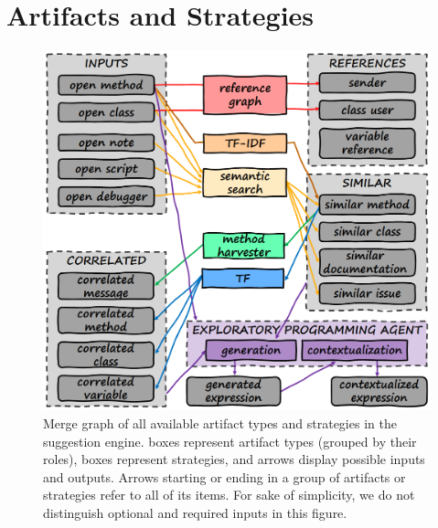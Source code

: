 
\section{Artifacts and Strategies}
\label{sec:suggestions/overview}

\begin{figure}
	\begin{minipage}{\textwidth}
		\centering
		\includegraphics[height=17\baselineskip]{01_overview/graph.png}
		\caption[Merge graph of all available artifact types and strategies in the suggestion engine.]{
			Merge graph of all available artifact types and strategies in the suggestion engine.
			\bold{\textcolor{gray}{Gray}} boxes represent artifact types (grouped by their roles\footnotemark),  boxes represent strategies, and arrows display possible inputs and outputs.
			Arrows starting or ending in a group of artifacts or strategies refer to all of its items.
			For sake of simplicity, we do not distinguish optional and required inputs in this figure.
		}
		\label{fig:suggestions/overview/graph}
	\end{minipage}
\end{figure}

